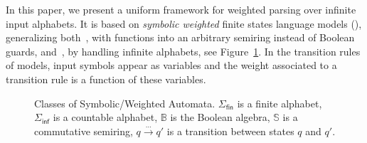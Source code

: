 In this paper, we present a uniform framework for weighted parsing over infinite input alphabets.
It is based on \emph{symbolic weighted} finite states language models (\swM), generalizing 
both~\SA, with functions into an arbitrary semiring instead of Boolean guards, 
and~\WA, by handling infinite alphabets, see Figure~\ref{fig:hierarchy}.
In the transition rules of \swM models, input symbols appear as variables %
and the weight associated to a transition rule is a function of these variables.
%
\begin{figure}
\centering
{}
\caption{Classes of Symbolic/Weighted Automata. 
$\Sigma_\mathsf{fin}$ is a finite alphabet, 
$\Sigma_\mathsf{inf}$ is a countable alphabet, 
$\mathbb{B}$ is the Boolean algebra, 
$\mathbb{S}$ is a commutative semiring, 
$q \xrightarrow{\dots} q'$ is a transition between states $q$ and $q'$.}
\label{fig:hierarchy}  
\end{figure}

